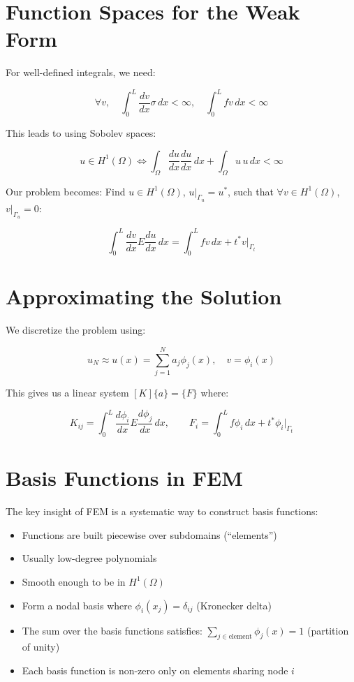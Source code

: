 \documentclass[
  11pt,
  a4paper,
]{scrbook}
\providecommand{\tightlist}{%
  \setlength{\itemsep}{0pt}\setlength{\parskip}{0pt}}\usepackage{longtable,booktabs,array}
\begin{document}
\section{Function Spaces for the Weak
Form}\label{function-spaces-for-the-weak-form}

For well-defined integrals, we need:

\[\forall v, \quad \int_0^L \frac{dv}{dx} \sigma \, dx < \infty, \quad \int_0^L f v \, dx < \infty\]

This leads to using Sobolev spaces:

\[u \in H^1(\Omega) \iff \int_\Omega \frac{du}{dx}\frac{du}{dx} \, dx + \int_\Omega u\, u \, dx < \infty\]

Our problem becomes: Find \(u \in H^1(\Omega)\),
\(u|_{\Gamma_u} = u^*\), such that \(\forall v \in H^1(\Omega)\),
\(v|_{\Gamma_u} = 0\):

\[\int_0^L \frac{dv}{dx} E \frac{du}{dx} \, dx = \int_0^L f v \, dx + t^* v|_{\Gamma_t}\]

\section{Approximating the Solution}\label{approximating-the-solution}

We discretize the problem using:

\[u_N \approx u(x) = \sum_{j=1}^{N} a_j \phi_j(x), \quad v = \phi_i(x)\]

This gives us a linear system \([K]\{a\} = \{F\}\) where:

\[K_{ij} = \int_0^L \frac{d\phi_i}{dx} E \frac{d\phi_j}{dx} \, dx, \qquad F_i = \int_0^L f \phi_i \, dx + t^* \phi_i|_{\Gamma_t}\]

\section{Basis Functions in FEM}\label{basis-functions-in-fem}

The key insight of FEM is a systematic way to construct basis functions:

\begin{itemize}
\tightlist
\item
  Functions are built piecewise over subdomains (``elements'')
\item
  Usually low-degree polynomials
\item
  Smooth enough to be in \(H^1(\Omega)\)
\item
  Form a nodal basis where \(\phi_i(x_j) = \delta_{ij}\) (Kronecker
  delta)
\item
  The sum over the basis functions satisfies:
  \(\sum_{j\in \text{element}} \phi_j(x) = 1\) (partition of unity)
\item
  Each basis function is non-zero only on elements sharing node \(i\)
\end{itemize}
\end{document}
